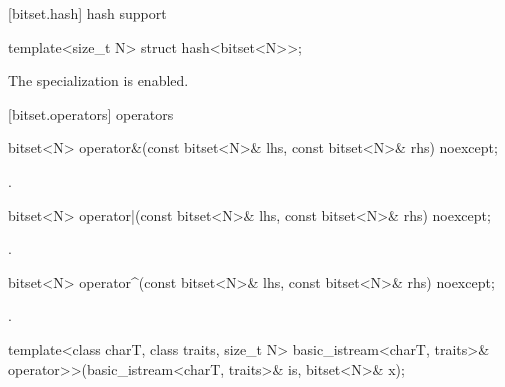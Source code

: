 [bitset.hash]{ hash support}

%
\begin{itemdecl}
template<size_t N> struct hash<bitset<N>>;
\end{itemdecl}

\begin{itemdescr}
\pnum
The specialization is enabled.
\end{itemdescr}


[bitset.operators]{ operators}

%
\begin{itemdecl}
bitset<N> operator&(const bitset<N>& lhs, const bitset<N>& rhs) noexcept;
\end{itemdecl}

\begin{itemdescr}
\pnum
\returns
{}.
\end{itemdescr}

%
\begin{itemdecl}
bitset<N> operator|(const bitset<N>& lhs, const bitset<N>& rhs) noexcept;
\end{itemdecl}

\begin{itemdescr}
\pnum
\returns
{}.
\end{itemdescr}

%
\begin{itemdecl}
bitset<N> operator^(const bitset<N>& lhs, const bitset<N>& rhs) noexcept;
\end{itemdecl}

\begin{itemdescr}
\pnum
\returns
{}.
\end{itemdescr}

%
\begin{itemdecl}
template<class charT, class traits, size_t N>
  basic_istream<charT, traits>&
    operator>>(basic_istream<charT, traits>& is, bitset<N>& x);
\end{itemdecl}

